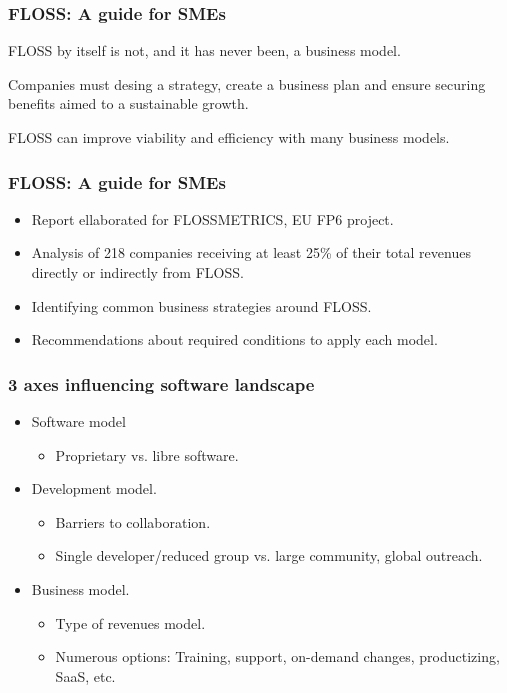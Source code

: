 
\begin{frame}
 \frametitle{FLOSS: A guide for SMEs}
\begin{center}
 \begin{LARGE} FLOSS by itself is not, and it has never been, a business model. \end{LARGE}
\end{center}
\begin{center}
 Companies must desing a \alert{strategy}, create a \alert{business plan} and ensure 
\alert{securing benefits} aimed to a sustainable growth.
\end{center}
\begin{center}
 FLOSS can improve \alert{viability} and \alert{efficiency} with many business models.
\end{center}


\end{frame}

\begin{frame}
 \frametitle{FLOSS: A guide for SMEs}
 \begin{itemize}
  \item Report ellaborated for FLOSSMETRICS, EU FP6 project.
  \item Analysis of 218 companies receiving at least 25\% of their total revenues directly or indirectly from FLOSS.
  \item Identifying common business strategies around FLOSS.
  \item Recommendations about required conditions to apply each model.
 \end{itemize}
\end{frame}

\begin{frame}
 \frametitle{3 axes influencing software landscape}
 \begin{itemize}
  \item \alert{Software model}
  \begin{itemize}
   \item Proprietary vs. libre software.
  \end{itemize}
  \item \alert{Development model}.
  \begin{itemize}
   \item Barriers to collaboration.
   \item Single developer/reduced group vs. large community, global outreach.
  \end{itemize}
  \item \alert{Business model}.
  \begin{itemize}
   \item Type of revenues model.
   \item Numerous options: Training, support, on-demand changes, productizing, SaaS, etc.
  \end{itemize}
 \end{itemize}
\end{frame}

